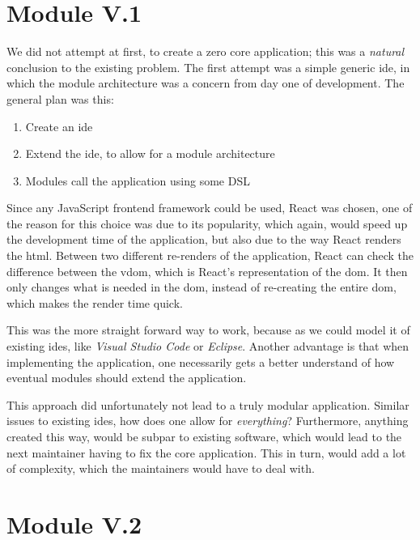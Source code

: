 \section{Module V.1} \label{sec:mod1}

We did not attempt at first, to create a zero core application; this was a
\textit{natural} conclusion to the existing problem. The first attempt was a
simple generic \gls*{ide}, in which the module architecture was a concern from
day one of development. The general plan was this:

\begin{enumerate}
  \item Create an \gls*{ide}
  \item Extend the \gls*{ide}, to allow for a module architecture
  \item Modules call the application using some DSL
\end{enumerate}

Since any JavaScript frontend framework could be used, React was chosen, one of
the reason for this choice was due to its popularity, which again, would speed
up the development time of the application, but also due to the way React
renders the \gls*{html}. Between two different re-renders of the application,
React can check the difference between the \gls*{vdom}, which is React's
representation of the \gls*{dom}. It then only changes what is needed in the
\gls*{dom}, instead of re-creating the entire \gls*{dom}, which makes the render
time quick.

This was the more straight forward way to work, because as we could model it of
existing \gls*{ide}s, like \textit{Visual Studio Code} or \textit{Eclipse}.
Another advantage is that when implementing the application, one necessarily
gets a better understand of how eventual modules should extend the application.

This approach did unfortunately not lead to a truly modular application. Similar
issues to existing \gls*{ide}s, how does one allow for \textit{everything}?
Furthermore, anything created this way, would be subpar to existing software,
which would lead to the next maintainer having to fix the core application. This
in turn, would add a lot of complexity, which the maintainers would have to deal with.

\section{Module V.2} \label{sec:mod2}

